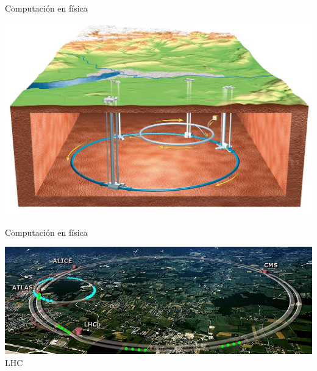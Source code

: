 \documentclass[10pt,xcolor={dvipsnames}]{beamer}
\begin{document}
\begin{frame}{Computación en física}
\begin{center}
\includegraphics[scale=0.38]{Figures/bajotierra}
\end{center}
\end{frame}


\begin{frame}{Computación en física}
\begin{center}
\includegraphics[scale=0.3]{Figures/LHC}
LHC
\end{center}
\end{frame}
\end{document}
